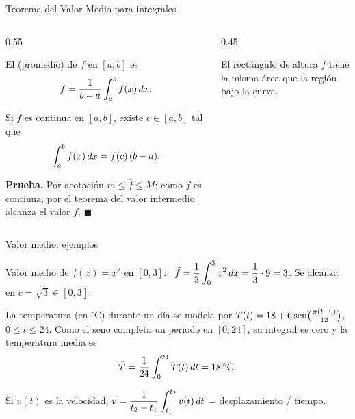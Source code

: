 \documentclass[10pt,aspectratio=169]{beamer}
\begin{document}
\begin{frame}{Teorema del Valor Medio para integrales}
  \begin{columns}
    \begin{column}{0.55\textwidth}
      \begin{definicion}
        El  (promedio) de $f$ en $[a,b]$ es
        \[ \bar f=\frac{1}{b-a}\int_a^bf(x)\,dx. \]
      \end{definicion}
      \begin{teorema}
        Si $f$ es continua en $[a,b]$, existe $c\in[a,b]$ tal que
        \[ \int_a^bf(x)\,dx=f(c)\,(b-a). \]
      \end{teorema}
      \textbf{Prueba.} Por acotación $m\le\bar f\le M$; como $f$ es continua, por el teorema del valor intermedio
      alcanza el valor $\bar f$. $\blacksquare$
    \end{column}
    \begin{column}{0.45\textwidth}
      \centering

      \small El rectángulo de altura $\bar f$ tiene la misma área que la región bajo la curva.
    \end{column}
  \end{columns}
\end{frame}

\begin{frame}{Valor medio: ejemplos}
  \begin{ejemplo}[1]
    Valor medio de $f(x)=x^2$ en $[0,3]$: \ $\bar f=\dfrac13\displaystyle\int_0^3x^2\,dx=\frac13\cdot9=3$.
    Se alcanza en $c=\sqrt3\in[0,3]$.
  \end{ejemplo}
  \begin{ejemplo}
    La temperatura (en $^\circ$C) durante un día se modela por $T(t)=18+6\operatorname{sen}\!\big(\frac{\pi(t-9)}{12}\big)$,
    $0\le t\le24$. Como el seno completa un periodo en $[0,24]$, su integral es cero y la temperatura media es
    \[ \bar T=\frac1{24}\int_0^{24}T(t)\,dt=18\,^\circ\text{C}. \]
  \end{ejemplo}
  \begin{ejemplo}
    Si $v(t)$ es la velocidad, $\displaystyle\bar v=\frac{1}{t_2-t_1}\int_{t_1}^{t_2}v(t)\,dt$ = desplazamiento / tiempo.
  \end{ejemplo}
\end{frame}
\end{document}
